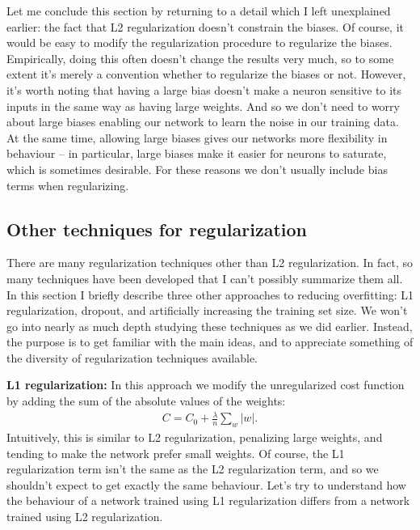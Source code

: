 \documentclass[a4paper,twoside,10pt]{book}
\begin{document}
Let me conclude this section by returning to a detail which I left unexplained earlier: the fact that L2 regularization doesn't constrain the biases. Of course, it would be easy to modify the regularization procedure to regularize the biases. Empirically, doing this often doesn't change the results very much, so to some extent it's merely a convention whether to regularize the biases or not. However, it's worth noting that having a large bias doesn't make a neuron sensitive to its inputs in the same way as having large weights. And so we don't need to worry about large biases enabling our network to learn the noise in our training data. At the same time, allowing large biases gives our networks more flexibility in behaviour -- in particular, large biases make it easier for neurons to saturate, which is sometimes desirable. For these reasons we don't usually include bias terms when regularizing.


\subsection{Other techniques for regularization}
There are many regularization techniques other than L2 regularization. In fact, so many techniques have been developed that I can't possibly summarize them all. In this section I briefly describe three other approaches to reducing overfitting: L1 regularization, dropout, and artificially increasing the training set size. We won't go into nearly as much depth studying these techniques as we did earlier. Instead, the purpose is to get familiar with the main ideas, and to appreciate something of the diversity of regularization techniques available.

\textbf{L1 regularization:} In this approach we modify the unregularized cost function by adding the sum of the absolute values of the weights:
\begin{eqnarray}  C = C_0 + \frac{\lambda}{n} \sum_w |w|.\label{eq:95}
\end{eqnarray}
Intuitively, this is similar to L2 regularization, penalizing large weights, and tending to make the network prefer small weights. Of course, the L1 regularization term isn't the same as the L2 regularization term, and so we shouldn't expect to get exactly the same behaviour. Let's try to understand how the behaviour of a network trained using L1 regularization differs from a network trained using L2 regularization.
\end{document}
